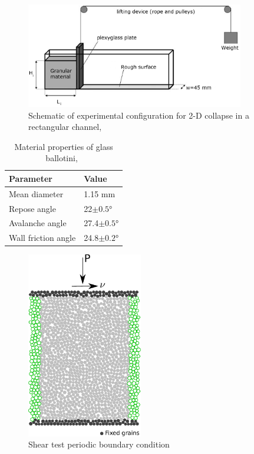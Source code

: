 \begin{figure}[tbhp]
\centering
\includegraphics[width=0.85\textwidth]{experiment_setup}
\caption{Schematic of experimental configuration for 2-D collapse in a 
rectangular channel,~\citep{Lajeunesse2004}}
\label{fig:exp}
\end{figure}

\begin{table}[tbhp]
\caption{Material properties of glass ballotini,~\citep{Lajeunesse2004}}
\label{table:mat_prop}
\centering
\begin{tabular}{ll}
\toprule
\textbf{Parameter} & \textbf{Value} \\ \midrule
Mean diameter & 1.15 \si{\mm} \\
Repose angle & 22$\pm 0.5$\si{\degree} \\
Avalanche angle & 27.4$\pm 0.5$\si{\degree} \\
Wall friction angle & 24.8$\pm 0.2$\si{\degree}\\
\bottomrule
\end{tabular}
\end{table}

\begin{figure}[tbhp]
\centering
\includegraphics[width=0.45\textwidth]{simple_shear}
\caption{Shear test periodic boundary condition}
\label{fig:shear}
\end{figure}


